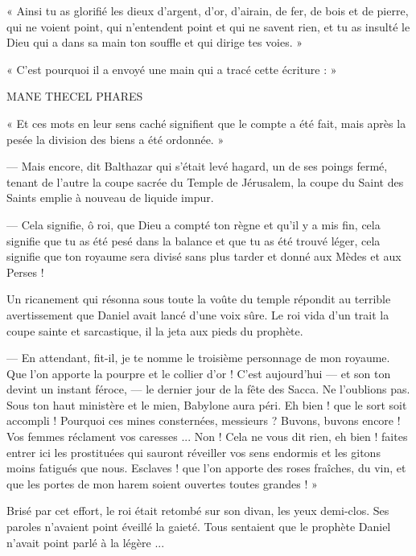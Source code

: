 \documentclass[a4paper, 11pt, oneside, polutonikogreek, french]{article}
\begin{document}
« Ainsi tu as glorifié les dieux d'argent, d'or, d'airain, de fer, de bois et de pierre, qui ne voient point, qui n'entendent point et qui ne savent rien, et tu as insulté le Dieu qui a dans sa main ton souffle et qui dirige tes voies. »

« C'est pourquoi il a envoyé une main qui a tracé cette écriture : »

MANE THECEL PHARES

« Et ces mots en leur sens caché signifient que le compte a été fait, mais après la pesée la division des biens a été ordonnée. »

--- Mais encore, dit Balthazar qui s'était levé hagard, un de ses poings fermé, tenant de l'autre la coupe sacrée du Temple de Jérusalem, la coupe du Saint des Saints emplie à nouveau de liquide impur.

--- Cela signifie, ô roi, que Dieu a compté ton règne et qu'il y a mis fin, cela signifie que tu as été pesé dans la balance et que tu as été trouvé léger, cela signifie que ton royaume sera divisé sans plus tarder et donné aux Mèdes et aux Perses !

\bigskip
\centerline{\EightStarTaper}
\centerline{\EightStarTaper\EightStarTaper}
\bigskip

Un ricanement qui résonna sous toute la voûte du temple répondit au terrible avertissement que Daniel avait lancé d'une voix sûre. Le roi vida d'un trait la coupe sainte et sarcastique, il la jeta aux pieds du prophète.

--- En attendant, fit-il, je te nomme le troisième personnage de mon royaume. Que l'on apporte la pourpre et le collier d'or ! C'est aujourd'hui --- et son ton devint un instant féroce, --- le dernier jour de la fête des Sacca. Ne l'oublions pas. Sous ton haut ministère et le mien, Babylone aura péri. Eh bien ! que le sort soit accompli ! Pourquoi ces mines consternées, messieurs ? Buvons, buvons encore ! Vos femmes réclament vos caresses ... Non ! Cela ne vous dit rien, eh bien ! faites entrer ici les prostituées qui sauront réveiller vos sens endormis et les gitons moins fatigués que nous. Esclaves ! que l'on apporte des roses fraîches, du vin, et que les portes de mon harem soient ouvertes toutes grandes ! »

\bigskip
\centerline{\EightStarTaper}
\centerline{\EightStarTaper\EightStarTaper}
\bigskip

Brisé par cet effort, le roi était retombé sur son divan, les yeux demi-clos. Ses paroles n'avaient point éveillé la gaieté. Tous sentaient que le prophète Daniel n'avait point parlé à la légère ...
\end{document}
